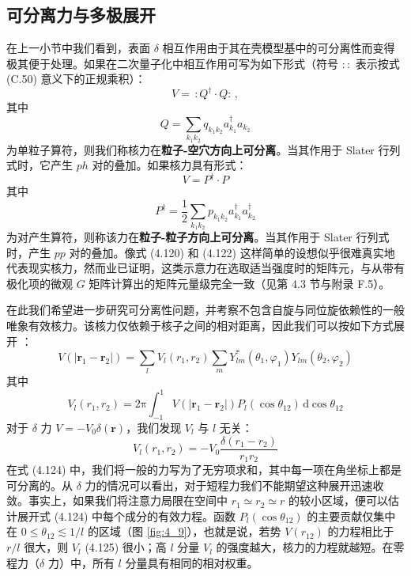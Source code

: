 \subsection{可分离力与多极展开}

在上一小节中我们看到，表面 $\delta$ 相互作用由于其在壳模型基中的可分离性而变得极其便于处理。如果在二次量子化中相互作用可写为如下形式（符号
$::$ 表示按式 (C.50) 意义下的正规乘积）：
\begin{equation}
V=\,:Q^{\dagger}\cdot Q:\,,\label{eq:4.120}
\end{equation}
其中
\begin{equation}
Q=\sum_{k_{1}k_{2}}q_{k_{1}k_{2}}a^{\dagger}_{k_{1}}a_{k_{2}}\label{eq:4.121}
\end{equation}
为单粒子算符，则我们称核力在\textbf{粒子-空穴方向上可分离}。当其作用于 Slater 行列式时，它产生 $ph$ 对的叠加。如果核力具有形式：
\begin{equation}
V=P^{\dagger}\cdot P\label{eq:4.122}
\end{equation}
其中
\begin{equation}
P^{\dagger}=\frac{1}{2}\sum_{k_{1}k_{2}}p_{k_{1}k_{2}}a^{\dagger}_{k_{1}}a^{\dagger}_{k_{2}}\label{eq:4.123}
\end{equation}
为对产生算符，则称该力在\textbf{粒子-粒子方向上可分离}。当其作用于 Slater 行列式时，产生 $pp$ 对的叠加。像式
(4.120) 和 (4.122) 这样简单的设想似乎很难真实地代表现实核力，然而业已证明，这类示意力在选取适当强度时的矩阵元，与从带有极化项的微观
$G$ 矩阵计算出的矩阵元量级完全一致（见第 4.3 节与附录 F.5）\cite{BK67b}。

在此我们希望进一步研究可分离性问题，并考察不包含自旋与同位旋依赖性的一般唯象有效核力。该核力仅依赖于核子之间的相对距离，因此我们可以按如下方式展开
\cite{La64}：
\begin{equation}
V(|\boldsymbol{r}_{1}-\boldsymbol{r}_{2}|)=\sum_{l}V_{l}(r_{1},r_{2})\sum_{m}Y^{*}_{lm}(\theta_{1},\varphi_{1})Y_{lm}(\theta_{2},\varphi_{2})\label{eq:4.124}
\end{equation}
其中
\begin{equation}
V_{l}(r_{1},r_{2})=2\mathrm{\pi}\int^{1}_{-1}V(|\boldsymbol{r}_{1}-\boldsymbol{r}_{2}|)P_{l}(\cos\theta_{12})\,\mathrm{d}\cos\theta_{12}\label{eq:4.125}
\end{equation}
对于 $\delta$ 力 $V=-V_{0}\delta(\boldsymbol{r})$，我们发现 $V_{l}$ 与 $l$
无关：
\begin{equation}
V_{l}(r_{1},r_{2})=-V_{0}\frac{\delta(r_{1}-r_{2})}{r_{1}r_{2}}\label{eq:4.126}
\end{equation}
在式 (4.124) 中，我们将一般的力写为了无穷项求和，其中每一项在角坐标上都是可分离的。从 $\delta$ 力的情况可以看出，对于短程力我们不能期望这种展开迅速收敛。事实上，如果我们将注意力局限在空间中
$r_{1}\simeq r_{2}\simeq r$ 的较小区域，便可以估计展开式 (4.124) 中每个成分的有效力程。函数
$P_{l}(\cos\theta_{12})$ 的主要贡献仅集中在 $0\le\theta_{12}\lesssim1/l$
的区域（图 \ref{fig:4_9}），也就是说，若势 $V(r_{12})$ 的力程相比于 $r/l$ 很大，则 $V_{l}$
(4.125) 很小；高 $l$ 分量 $V_{l}$ 的强度越大，核力的力程就越短。在零程力（$\delta$ 力）中，所有
$l$ 分量具有相同的相对权重。

